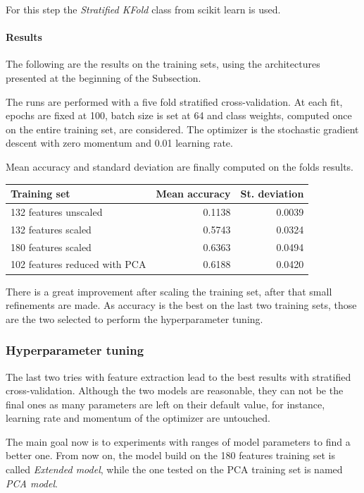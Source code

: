 For this step the \emph{Stratified KFold} class from scikit learn is used.~\cite{cross-scikit}

\paragraph{Results}
The following are the results on the training sets, using the architectures 
presented at the beginning of the Subsection. 

The runs are performed with a five fold stratified cross-validation. 
At each fit, epochs are fixed at 100, 
batch size is set at 64 and class weights, computed once on 
the entire training set, are considered. 
The optimizer is the stochastic gradient descent with zero momentum and 
0.01 learning rate. 

Mean accuracy and standard deviation are finally computed on the 
folds results.
\begin{center}
    \begin{tabular}{ |l|r|r| } 
        \hline
        Training set & Mean accuracy & St. deviation \\
        \hline
        132 features unscaled &  0.1138 & 0.0039 \\
        132 features scaled &  0.5743 & 0.0324 \\
        180 features scaled &  0.6363 & 0.0494 \\
        102 features reduced with PCA &  0.6188 & 0.0420 \\
        \hline
    \end{tabular}
\end{center}

There is a great improvement after scaling the training set, after 
that small refinements are made.
As accuracy is the best on the last two training sets, those are the two selected to 
perform the hyperparameter tuning.

\subsubsection{Hyperparameter tuning}

The last two tries with feature extraction lead to the best results 
with stratified cross-validation. Although the two models are reasonable, 
they can not be the final ones as many parameters are left on their default value, 
for instance, learning rate and momentum of the optimizer are untouched. 

The main goal now is to experiments with ranges of model parameters 
to find a better one. From now on, the model build on the 180 features training set is 
called \emph{Extended model}, 
while the one tested on the PCA training set is named \emph{PCA model}.

